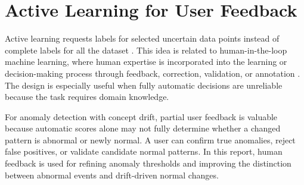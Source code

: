 
\section{Active Learning for User Feedback}

Active learning requests labels for selected uncertain data points instead of complete labels for all the dataset \citep{settles2009active}. This idea is related to human-in-the-loop machine learning, where human expertise is incorporated into the learning or decision-making process through feedback, correction, validation, or annotation \citep{amershi2014power,holzinger2016interactive}. The design is especially useful when fully automatic decisions are unreliable because the task requires domain knowledge. 

For anomaly detection with concept drift, partial user feedback is valuable because automatic scores alone may not fully determine whether a changed pattern is abnormal or newly normal. A user can confirm true anomalies, reject false positives, or validate candidate normal patterns. In this report, human feedback is used for refining anomaly thresholds and improving the distinction between abnormal events and drift-driven normal changes.